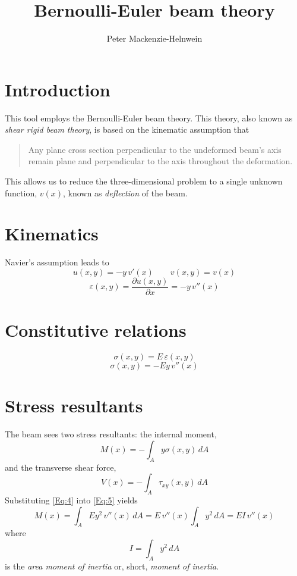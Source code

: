\documentclass[11pt, oneside]{article}   	%
\title{Bernoulli-Euler beam theory}
\author{Peter Mackenzie-Helnwein}
\begin{document}
\maketitle

\section{Introduction}
This tool employs the Bernoulli-Euler beam theory.  This theory, also known as \emph{shear rigid beam theory}, is based on the kinematic assumption  that
\begin{quote}
   Any plane cross section perpendicular to the undeformed beam's axis remain plane and perpendicular to the axis throughout the deformation.
\end{quote}
This allows us to reduce the three-dimensional problem to a single unknown function, $v(x)$, known as \emph{deflection} of the beam.

\section{Kinematics}
Navier's assumption leads to
\begin{equation}
	u(x,y) = -y \,v'(x)
	\qquad
	v(x,y) = v(x)
	\label{Eq:1}
\end{equation}
\begin{equation}
	\varepsilon(x,y) = \frac{\partial u(x,y)}{\partial x} = -y\, v''(x)
	\label{Eq:2}
\end{equation}

\section{Constitutive relations}
\begin{equation}
	\sigma(x,y) = E\,\varepsilon(x,y)
	\label{Eq:3}
\end{equation}
\begin{equation}
	\sigma(x,y) = -E y\,v''(x)
	\label{Eq:4}
\end{equation}

\section{Stress resultants}
The beam sees two stress resultants: the internal moment, 
\begin{equation}
	M(x) = -\int_A y\sigma(x,y)\, dA
	\label{Eq:5}
\end{equation}
and the transverse shear force,
\begin{equation}
	V(x)  = -\int_A \tau_{xy}(x,y)\, dA
	\label{Eq:6}
\end{equation}
Substituting \eqref{Eq:4} into \eqref{Eq:5} yields
\begin{equation}
	M(x) = \int_A E y^2 \, v''(x) \, dA = E\,v''(x) \int_A y^2\,dA = EI\,v''(x)
	\label{Eq:7}
\end{equation}
where 
\begin{equation}
	I = \int_A y^2\,dA
	\label{Eq:7b}
\end{equation}
is the \emph{area moment of inertia} or, short, \emph{moment of inertia}.
\end{document}
